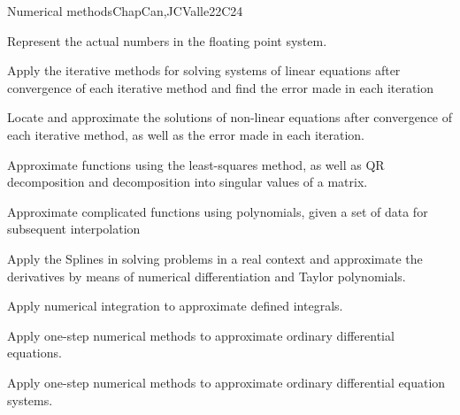 \begin{syllabus}
\begin{unit}{Numerical methods}{}{ChapCan,JCValle}{22}{C24}
   \begin{learningoutcomes}
     \item Represent the actual numbers in the floating point system.
     \item Apply the iterative methods for solving systems of linear equations after convergence of each iterative method and find the error made in each iteration
     \item Locate and approximate the solutions of non-linear equations after convergence of each iterative method, as well as the error made in each iteration.
     \item Approximate functions using the least-squares method, as well as QR decomposition and decomposition into singular values of a matrix.
     \item Approximate complicated functions using polynomials, given a set of data for subsequent interpolation
     \item Apply the Splines in solving problems in a real context and approximate the derivatives by means of numerical differentiation and Taylor polynomials.
     \item Apply numerical integration to approximate defined integrals.
     \item Apply one-step numerical methods to approximate ordinary differential equations.
     \item Apply one-step numerical methods to approximate ordinary differential equation systems.
  \end{learningoutcomes}
 \end{unit}

\begin{coursebibliography}
\end{coursebibliography}

\end{syllabus}

%
